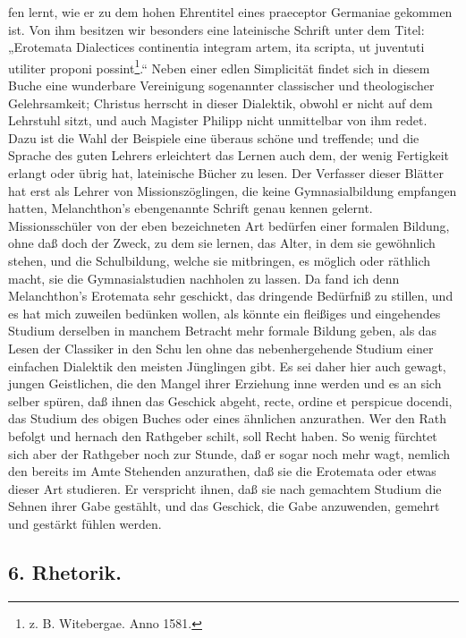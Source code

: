 fen lernt, wie er zu dem hohen Ehrentitel eines praeceptor Germaniae gekommen ist. Von ihm besitzen wir besonders eine lateinische Schrift unter dem Titel: „Erotemata Dialectices continentia integram artem, ita scripta, ut juventuti utiliter proponi possint\footnote{z. B. Witebergae. Anno 1581.}.“ Neben einer edlen Simplicität findet sich in diesem Buche eine wunderbare Vereinigung sogenannter classischer und theologischer Gelehrsamkeit; Christus herrscht in dieser Dialektik, obwohl er nicht auf dem Lehrstuhl sitzt, und auch Magister Philipp nicht unmittelbar von ihm redet. Dazu ist die Wahl der Beispiele eine überaus schöne und treffende; und die Sprache des guten Lehrers erleichtert das Lernen auch dem, der wenig Fertigkeit erlangt oder übrig hat, lateinische Bücher zu lesen. Der Verfasser dieser Blätter hat erst als Lehrer von Missionszöglingen, die keine Gymnasialbildung empfangen hatten, Melanchthon’s ebengenannte Schrift genau kennen gelernt. Missionsschüler von der eben bezeichneten Art bedürfen einer formalen Bildung, ohne daß doch der Zweck, zu dem sie lernen, das Alter, in dem sie gewöhnlich stehen, und die Schulbildung, welche sie mitbringen, es möglich oder räthlich macht, sie die Gymnasialstudien nachholen zu lassen. Da fand ich denn Melanchthon’s Erotemata sehr geschickt, das dringende Bedürfniß zu stillen, und es hat mich zuweilen bedünken wollen, als könnte ein fleißiges und eingehendes Studium derselben in manchem Betracht mehr formale Bildung geben, als das Lesen der Classiker in den Schu%
len ohne das nebenhergehende Studium einer einfachen Dialektik den meisten Jünglingen gibt. Es sei daher hier auch gewagt, jungen Geistlichen, die den Mangel ihrer Erziehung inne werden und es an sich selber spüren, daß ihnen das Geschick abgeht, recte, ordine et perspicue docendi, das Studium des obigen Buches oder eines ähnlichen anzurathen. Wer den Rath befolgt und hernach den Rathgeber schilt, soll Recht haben. So wenig fürchtet sich aber der Rathgeber noch zur Stunde, daß er sogar noch mehr wagt, nemlich den bereits im Amte Stehenden anzurathen, daß sie die Erotemata oder etwas dieser Art studieren. Er verspricht ihnen, daß sie nach gemachtem Studium die Sehnen ihrer Gabe gestählt, und das Geschick, die Gabe anzuwenden, gemehrt und gestärkt fühlen werden.

\subsection*{6. Rhetorik.}

